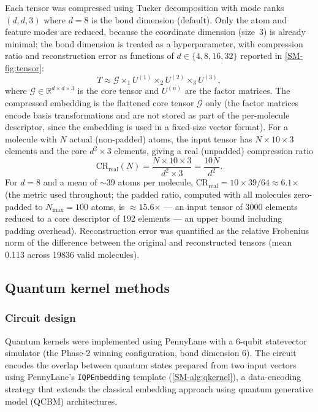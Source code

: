 \documentclass[11pt,a4paper]{article}
\begin{document}
Each tensor was compressed using Tucker decomposition \citep{tensorly_2019} with mode ranks $(d, d, 3)$ where $d = 8$ is the bond dimension (default). Only the atom and feature modes are reduced, because the coordinate dimension (size~3) is already minimal; the bond dimension is treated as a hyperparameter, with compression ratio and reconstruction error as functions of $d \in \{4, 8, 16, 32\}$ reported in \cref{SM-fig:tensor}:
\begin{equation}
T \approx \mathcal{G} \times_1 U^{(1)} \times_2 U^{(2)} \times_3 U^{(3)},
\end{equation}
where $\mathcal{G} \in \mathbb{R}^{d \times d \times 3}$ is the core tensor and $U^{(n)}$ are the factor matrices. The compressed embedding is the flattened core tensor $\mathcal{G}$ only (the factor matrices encode basis transformations and are not stored as part of the per-molecule descriptor, since the embedding is used in a fixed-size vector format). For a molecule with $N$ actual (non-padded) atoms, the input tensor has $N \times 10 \times 3$ elements and the core $d^2 \times 3$ elements, giving a real (unpadded) compression ratio
\begin{equation}
\mathrm{CR}_{\text{real}}(N) = \frac{N \times 10 \times 3}{d^2 \times 3} = \frac{10N}{d^2}.
\end{equation}
For $d = 8$ and a mean of $\sim$39 atoms per molecule, $\mathrm{CR}_{\text{real}} = 10 \times 39 / 64 \approx \num{6.1}$$\times$ (the metric used throughout; the padded ratio, computed with all molecules zero-padded to $N_{\max}=100$ atoms, is $\approx \num{15.6}$$\times$ --- an input tensor of \num{3000} elements reduced to a core descriptor of \num{192} elements --- an upper bound including padding overhead). Reconstruction error was quantified as the relative Frobenius norm of the difference between the original and reconstructed tensors (mean \num{0.113} across \num{19836} valid molecules).

\subsection{Quantum kernel methods}

\subsubsection{Circuit design}

Quantum kernels were implemented using PennyLane \citep{pennylane_2024} with a 6-qubit statevector simulator (the Phase-2 winning configuration, bond dimension 6). The circuit encodes the overlap between quantum states prepared from two input vectors using PennyLane's \texttt{IQPEmbedding} template (\cref{SM-alg:qkernel}), a data-encoding strategy that extends the classical embedding approach using quantum generative model (QCBM) architectures.
\end{document}
